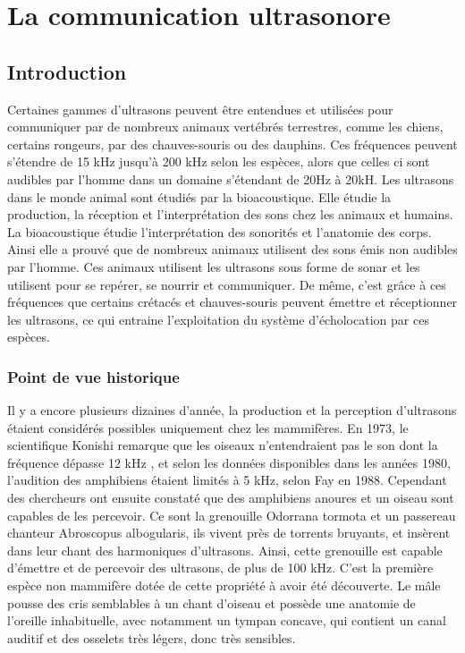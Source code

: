 \chapter{La communication ultrasonore}

\section{Introduction}

Certaines gammes d'ultrasons peuvent être entendues et utilisées pour
communiquer par de nombreux animaux vertébrés terrestres, comme les
chiens, certains rongeurs, par des chauves-souris ou des dauphins. Ces
fréquences peuvent s'étendre de 15 kHz jusqu'à 200 kHz selon les
espèces, alors que celles ci sont audibles par l'homme dans un domaine
s'étendant de 20Hz à 20kH. Les ultrasons dans le monde animal sont
étudiés par la bioacoustique. Elle étudie la production, la réception et
l'interprétation des sons chez les animaux et humains. La bioacoustique
étudie l'interprétation des sonorités et l'anatomie des corps. Ainsi
elle a prouvé que de nombreux animaux utilisent des sons émis non
audibles par l'homme. Ces animaux utilisent les ultrasons sous forme de
sonar et les utilisent pour se repérer, se nourrir et communiquer. De
même, c'est grâce à ces fréquences que certains crétacés et
chauves-souris peuvent émettre et réceptionner les ultrasons, ce qui
entraine l'exploitation du système d'écholocation par ces espèces.

\subsection{Point de vue historique}

Il y a encore plusieurs dizaines d'année, la production et la perception
d'ultrasons étaient considérés possibles uniquement chez les mammifères.
En 1973, le scientifique Konishi remarque que les oiseaux n'entendraient
pas le son dont la fréquence dépasse 12 kHz , et selon les données
disponibles dans les années 1980, l'audition des amphibiens étaient
limités à 5 kHz, selon Fay en 1988. Cependant des chercheurs ont ensuite
constaté que des amphibiens anoures et un oiseau sont capables de les
percevoir. Ce sont la grenouille Odorrana tormota et un passereau
chanteur Abroscopus albogularis, ils vivent près de torrents bruyants,
et insèrent dans leur chant des harmoniques d'ultrasons. Ainsi, cette
grenouille est capable d'émettre et de percevoir des ultrasons, de plus
de 100 kHz. C'est la première espèce non mammifère dotée de cette
propriété à avoir été découverte. Le mâle pousse des cris semblables à
un chant d'oiseau et possède une anatomie de l'oreille inhabituelle,
avec notamment un tympan concave, qui contient un canal auditif et des
osselets très légers, donc très sensibles.

